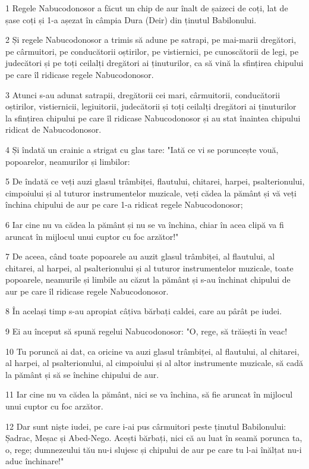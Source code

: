 \par 1 Regele Nabucodonosor a făcut un chip de aur înalt de șaizeci de coți, lat de șase coți și 1-a așezat în câmpia Dura (Deir) din ținutul Babilonului.
\par 2 Și regele Nabucodonosor a trimis să adune pe satrapi, pe mai-marii dregători, pe cârmuitori, pe conducătorii oștirilor, pe vistiernici, pe cunoscătorii de legi, pe judecători și pe toți ceilalți dregători ai ținuturilor, ca să vină la sfințirea chipului pe care îl ridicase regele Nabucodonosor.
\par 3 Atunci s-au adunat satrapii, dregătorii cei mari, cârmuitorii, conducătorii oștirilor, vistiernicii, legiuitorii, judecătorii și toți ceilalți dregători ai ținuturilor la sfințirea chipului pe care îl ridicase Nabucodonosor și au stat înaintea chipului ridicat de Nabucodonosor.
\par 4 Și îndată un crainic a strigat cu glas tare: "Iată ce vi se poruncește vouă, popoarelor, neamurilor și limbilor:
\par 5 De îndată ce veți auzi glasul trâmbiței, flautului, chitarei, harpei, psalterionului, cimpoiului și al tuturor instrumentelor muzicale, veți cădea la pământ și vă veți închina chipului de aur pe care 1-a ridicat regele Nabucodonosor;
\par 6 Iar cine nu va cădea la pământ și nu se va închina, chiar în acea clipă va fi aruncat în mijlocul unui cuptor cu foc arzător!"
\par 7 De aceea, când toate popoarele au auzit glasul trâmbiței, al flautului, al chitarei, al harpei, al psalterionului și al tuturor instrumentelor muzicale, toate popoarele, neamurile și limbile au căzut la pământ și s-au închinat chipului de aur pe care îl ridicase regele Nabucodonosor.
\par 8 În același timp s-au apropiat câțiva bărbați caldei, care au pârât pe iudei.
\par 9 Ei au început să spună regelui Nabucodonosor: "O, rege, să trăiești în veac!
\par 10 Tu poruncă ai dat, ca oricine va auzi glasul trâmbiței, al flautului, al chitarei, al harpei, al psalterionului, al cimpoiului și al altor instrumente muzicale, să cadă la pământ și să se închine chipului de aur.
\par 11 Iar cine nu va cădea la pământ, nici se va închina, să fie aruncat în mijlocul unui cuptor cu foc arzător.
\par 12 Dar sunt niște iudei, pe care i-ai pus cârmuitori peste ținutul Babilonului: Șadrac, Meșac și Abed-Nego. Acești bărbați, nici că au luat în seamă porunca ta, o, rege; dumnezeului tău nu-i slujesc și chipului de aur pe care tu l-ai înălțat nu-i aduc închinare!"
